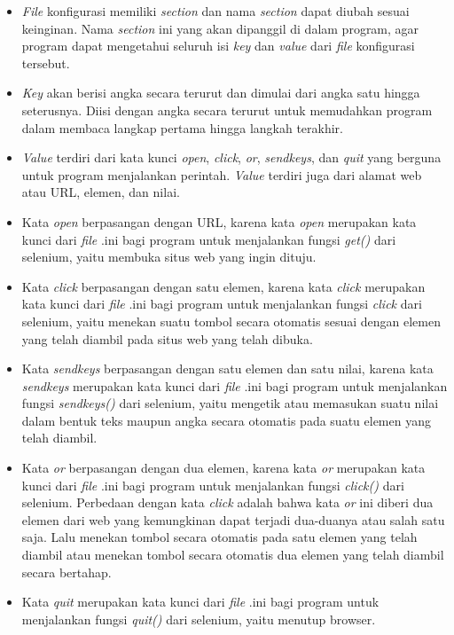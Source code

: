 \begin{itemize}
	\item \textit{File} konfigurasi memiliki \textit{section} dan nama \textit{section} dapat diubah sesuai keinginan. Nama \textit{section} ini yang akan dipanggil di dalam program, agar program dapat mengetahui seluruh isi \textit{key} dan \textit{value} dari \textit{file} konfigurasi tersebut.
	\item \textit{Key} akan berisi angka secara terurut dan dimulai dari angka satu hingga seterusnya. Diisi dengan angka secara terurut untuk memudahkan program dalam membaca langkap pertama hingga langkah terakhir.
	\item \textit{Value} terdiri dari kata kunci \textit{open}, \textit{click}, \textit{or}, \textit{sendkeys}, dan \textit{quit} yang berguna untuk program menjalankan perintah. \textit{Value} terdiri juga dari alamat web atau URL, elemen, dan nilai.
	\item Kata \textit{open} berpasangan dengan URL, karena kata \textit{open} merupakan kata kunci dari \textit{file} .ini bagi program untuk menjalankan fungsi \textit{get()} dari selenium, yaitu membuka situs web yang ingin dituju.
	\item Kata \textit{click} berpasangan dengan satu elemen, karena kata \textit{click} merupakan kata kunci dari \textit{file} .ini bagi program untuk menjalankan fungsi \textit{click} dari selenium, yaitu menekan suatu tombol secara otomatis sesuai dengan elemen yang telah diambil pada situs web yang telah dibuka.
	\item Kata \textit{sendkeys} berpasangan dengan satu elemen dan satu nilai, karena kata \textit{sendkeys} merupakan kata kunci dari \textit{file} .ini bagi program untuk menjalankan fungsi \textit{sendkeys()} dari selenium, yaitu mengetik atau memasukan suatu nilai dalam bentuk teks maupun angka secara otomatis pada suatu elemen yang telah diambil.
	\item Kata \textit{or} berpasangan dengan dua elemen, karena kata \textit{or} merupakan kata kunci dari \textit{file} .ini bagi program untuk menjalankan fungsi \textit{click()} dari selenium. Perbedaan dengan kata \textit{click} adalah bahwa kata \textit{or} ini diberi dua elemen dari web yang kemungkinan dapat terjadi dua-duanya atau salah satu saja. Lalu menekan tombol secara otomatis pada satu elemen yang telah diambil atau menekan tombol secara otomatis dua elemen yang telah diambil secara bertahap.  
	\item Kata \textit{quit} merupakan kata kunci dari \textit{file} .ini bagi program untuk menjalankan fungsi \textit{quit()} dari selenium, yaitu menutup browser.
\end{itemize}

